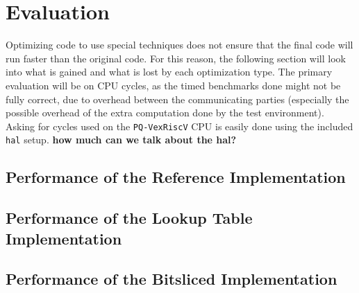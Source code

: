 \section{Evaluation} \label{evalsec}
Optimizing code to use special techniques does not ensure that the final code will run faster than the original code. For this reason, the following section will look into what is gained and what is lost by each optimization type. The primary evaluation will be on CPU cycles, as the timed benchmarks done might not be fully correct, due to overhead between the communicating parties (especially the possible overhead of the extra computation done by the test environment). Asking for cycles used on the \texttt{PQ-VexRiscV} CPU is easily done using the included \texttt{hal} setup. \textbf{how much can we talk about the hal?}
\subsection{Performance of the Reference Implementation}
\subsection{Performance of the Lookup Table Implementation}
\subsection{Performance of the Bitsliced Implementation}